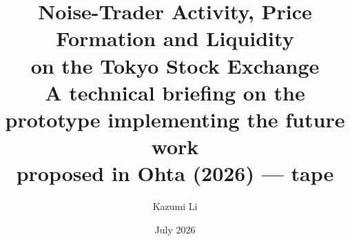 \documentclass[12pt,a4paper]{article}
\title{\textbf{Noise-Trader Activity, Price Formation and Liquidity\\
on the Tokyo Stock Exchange}\\[0.5em]
\large A technical briefing on the prototype implementing the future work\\
proposed in Ohta (2026) --- \StudySpan{} tape}
\author{Kazumi Li}
\date{July 2026}
\begin{document}
\renewcommand{\abstractname}{Summary}

\maketitle

\begin{abstract}
\noindent

\end{abstract}

\vspace{1em}
\tableofcontents
\clearpage












\cleardoublepage
\printbibliography[heading=bibintoc,title={References}]

\clearpage
\begin{appendices}

\clearpage

\clearpage

\end{appendices}
\end{document}
